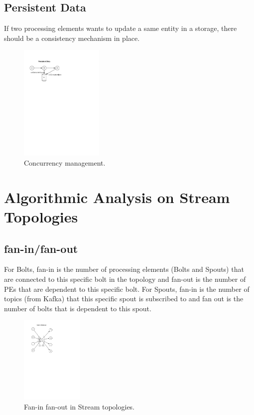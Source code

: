 \subsection{Persistent Data}

If two processing elements wants to update a same entity in a storage, there should be a consistency mechanism in place. 


\begin{figure}[h!]
	\begin{center}
		\includegraphics[width=4cm]{images/persistence}
		\caption{Concurrency management.}
		\label{fig:persistence}
	\end{center}
\end{figure}

\section{Algorithmic Analysis on Stream Topologies}

\subsection{fan-in/fan-out}

For Bolts, fan-in is the number of processing elements (Bolts and Spouts) that are connected to this specific bolt in the topology and fan-out is the number of PEs that are dependent to this specific bolt. For Spouts, fan-in is the number of topics (from Kafka) that this specific spout is subscribed to and fan out is the number of bolts that is dependent to this spout.

\begin{figure}[h!]
	\begin{center}
		\includegraphics[width=3cm]{images/fan-in-out}
		\caption{Fan-in fan-out in Stream topologies.}
		\label{fig:fan}
	\end{center}
\end{figure}

